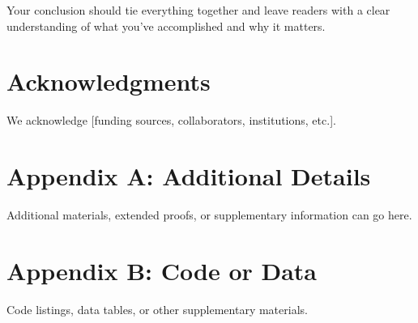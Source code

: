 \documentclass[11pt,a4paper]{article}
\theoremstyle{definition}
\begin{document}
Your conclusion should tie everything together and leave readers with a clear understanding of what you've accomplished and why it matters.

\section*{Acknowledgments}
We acknowledge [funding sources, collaborators, institutions, etc.].

\printbibliography

\appendix
\section{Appendix A: Additional Details}
Additional materials, extended proofs, or supplementary information can go here.

\section{Appendix B: Code or Data}
Code listings, data tables, or other supplementary materials.
\end{document}
